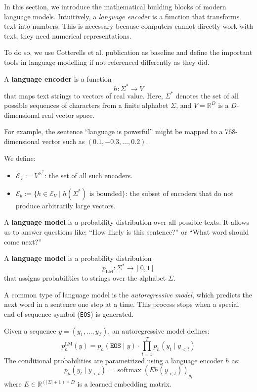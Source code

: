 In this section, we introduce the mathematical building blocks of modern language models. 
Intuitively, a \emph{language encoder} is a function that transforms text into numbers. 
This is necessary because computers cannot directly work with text, they need numerical representations.

To do so, we use Cotterells et al. publication \cite{cotterell_formal_2024} as baseline and define the important tools in language modelling if not referenced differently as they did.

\begin{definition}
A \textbf{language encoder} is a function
\[
h:\Sigma^* \rightarrow V
\]
that maps text strings to vectors of real value. 
Here, $\Sigma^*$ denotes the set of all possible sequences of characters from a finite alphabet $\Sigma$, and $V = \mathbb{R}^D$ is a $D$-dimensional real vector space.
\end{definition}

For example, the sentence “language is powerful” might be mapped to a 768-dimen\-sional vector such as $(0.1, -0.3, \dots, 0.2)$.


We define:

\begin{itemize}
    \item $\mathcal{E}_V := V^{\Sigma^*}$: the set of all such encoders.
    \item $\mathcal{E}_b := \{ h \in \mathcal{E}_V \mid h(\Sigma^*) \text{ is bounded} \}$: the subset of encoders that do not produce arbitrarily large vectors.
\end{itemize}

A \textbf{language model} is a probability distribution over all possible texts. 
It allows us to answer questions like: “How likely is this sentence?” or “What word should come next?”

\begin{definition}
A \textbf{language model} is a probability distribution
\[
p_{\mathrm{LM}}: \Sigma^* \rightarrow [0,1]
\]
that assigns probabilities to strings over the alphabet $\Sigma$.
\end{definition}

A common type of language model is the \emph{autoregressive model}, which predicts the next word in a sentence one step at a time. 
This process stops when a special end-of-sequence symbol (\texttt{EOS}) is generated.


\begin{definition}
Given a sequence $y = (y_1, \dots, y_T)$, an autoregressive model defines:
\[
p_h^{\mathrm{LM}}(y) = p_h(\texttt{EOS} \mid y) \cdot \prod_{t=1}^T p_h(y_t \mid y_{<t})
\]
The conditional probabilities are parametrized using a language encoder $h$ as:
\[
p_h(y_t \mid y_{<t}) = \operatorname{softmax}(E h(y_{<t}))_{y_t}
\]
where $E \in \mathbb{R}^{(|\Sigma|+1) \times D}$ is a learned embedding matrix.
\end{definition}

